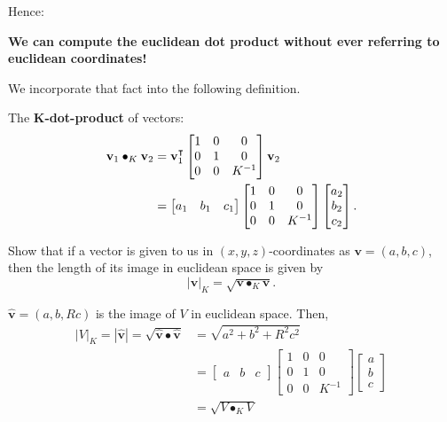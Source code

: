 \documentclass[newpage,hints,handout,12pt,noauthor,nooutcomes]{ximera}
\begin{document}
Hence:
\begin{center}
\textbf{We can compute the euclidean dot product without ever referring to euclidean coordinates!}
\end{center}
We incorporate that fact into the following definition.

\begin{definition}
The \textbf{$\boldsymbol{K}$-dot-product} of vectors:%
\begin{align*}
\mathbf{v}_{1}\bullet_{K}\mathbf{v}_{2}  &=\mathbf{v}_{1}^\transpose
\begin{bmatrix}
1 & 0 & 0\\
0 & 1 & 0\\
0 & 0 & K^{-1}%
\end{bmatrix}
\mathbf{v}_{2}\\
&=
\begin{bmatrix}
a_{1} & b_{1} & c_{1}%
\end{bmatrix}
\begin{bmatrix}
1 & 0 & 0\\
0 & 1 & 0\\
0 & 0 & K^{-1}%
\end{bmatrix}
\begin{bmatrix}
a_{2}\\
b_{2}\\
c_{2}%
\end{bmatrix}.
\end{align*}

\end{definition}

\begin{problem}
  Show that if a vector is given to us in $(x,y,z)$-coordinates as
  $\mathbf{v}=(a,b,c)$, then the length of its image in euclidean
  space is given by
  \[
  |\mathbf{v}|_K=\sqrt{\mathbf{v} \bullet_K \mathbf{v}}.
  \]
\begin{freeResponse}
$\hat{\mathbf v} = \left(a,b,Rc \right)$ is the image of $V$ in euclidean space. Then,
\begin{align*}
|V|_K = |\hat{\mathbf v}| = \sqrt{\hat{\mathbf v}\bullet\hat{\mathbf v}} 
&= \sqrt{a^{2} + b^{2} + R^{2}c^{2}} \\
&= \begin{bmatrix}
a & b & c%
\end{bmatrix}
\begin{bmatrix}
1 & 0 & 0\\
0 & 1 & 0\\
0 & 0 & K^{-1}%
\end{bmatrix}
\begin{bmatrix}
a\\
b\\
c%
\end{bmatrix} \\
&= \sqrt{V\bullet_K V}
\end{align*}
\end{freeResponse} 
\end{problem}
\end{document}
